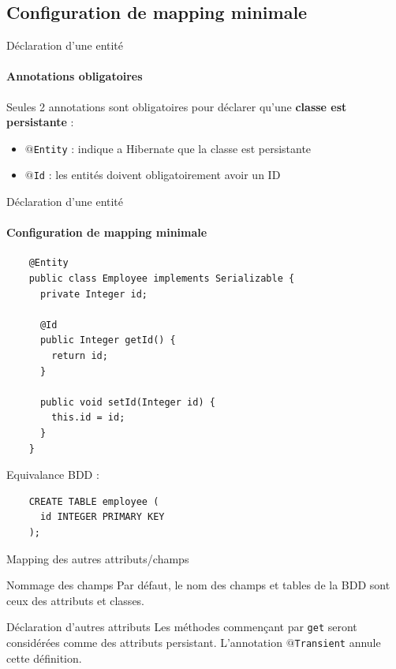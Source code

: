 \documentclass[compress]{beamer}%
\begin{document}
\subsection{Configuration de mapping minimale}
\begin{frame}{Déclaration d'une entité}
	\framesubtitle{Annotations obligatoires}
	
	Seules 2 annotations sont obligatoires pour déclarer qu'une \textbf{classe est persistante} :
	\pause
	\begin{itemize}[<+->]
		\item \texttt{$@$Entity} : indique a Hibernate que la classe est persistante
		\item \texttt{$@$Id} : les entités doivent obligatoirement avoir un ID
	\end{itemize}
	
\end{frame}

\begin{frame}[fragile]{Déclaration d'une entité}
	\framesubtitle{Configuration de mapping minimale}
	
	\begin{lstlisting}
	@Entity
	public class Employee implements Serializable {
	  private Integer id;
	  
	  @Id
	  public Integer getId() {
	    return id;
	  }
	  
	  public void setId(Integer id) {
	    this.id = id;
	  }
	}
	\end{lstlisting}
	
	\pause
	Equivalance BDD : 
	\begin{lstlisting}
	CREATE TABLE employee (
	  id INTEGER PRIMARY KEY
	);
	\end{lstlisting}
	
\end{frame}

\begin{frame}{Mapping des autres attributs/champs}

	\begin{block}{Nommage des champs}
		Par défaut, le nom des champs et tables de la BDD sont ceux des attributs et classes.
	\end{block}

	\pause
	\begin{block}{Déclaration d'autres attributs}
		Les méthodes commençant par \texttt{get} seront considérées comme des attributs persistant. L'annotation \texttt{$@$Transient} annule cette définition.
	\end{block}
	
\end{frame}
\end{document}

